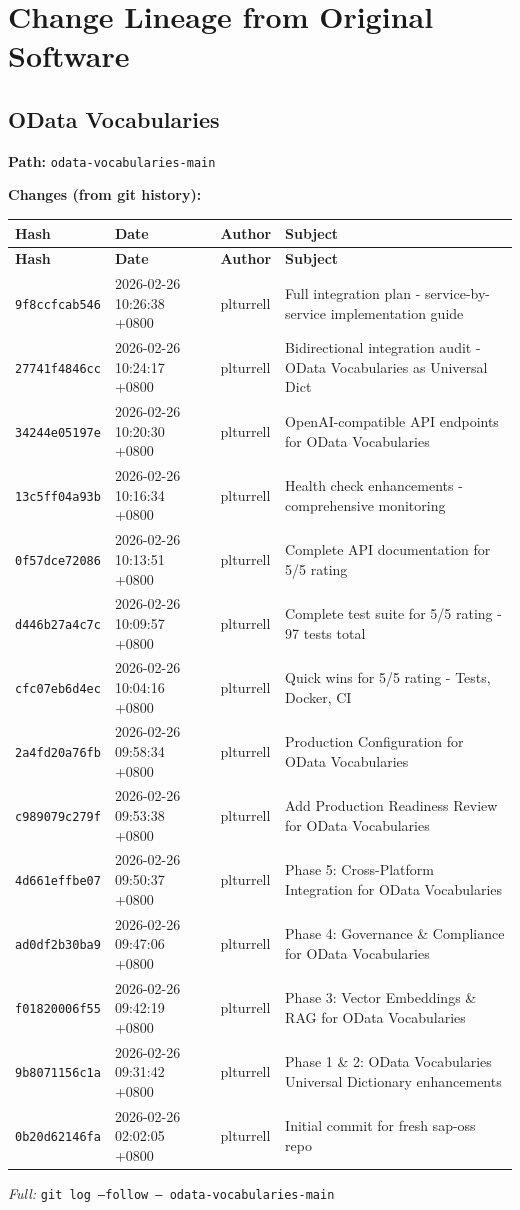 \documentclass[11pt]{article}
\begin{document}
\newpage
\section{Change Lineage from Original Software}

\subsection{OData Vocabularies}
\textbf{Path:} \texttt{odata-vocabularies-main}

\textbf{Changes (from git history):}
\begin{longtable}{|p{2.2cm}|p{3.2cm}|l|p{6cm}|}
\hline \textbf{Hash} & \textbf{Date} & \textbf{Author} & \textbf{Subject} \\ \hline \endfirsthead
\hline \textbf{Hash} & \textbf{Date} & \textbf{Author} & \textbf{Subject} \\ \hline \endhead
\texttt{9f8ccfcab546} & 2026-02-26 10:26:38 +0800 & plturrell & Full integration plan - service-by-service implementation guide \\
\texttt{27741f4846cc} & 2026-02-26 10:24:17 +0800 & plturrell & Bidirectional integration audit - OData Vocabularies as Universal Dict \\
\texttt{34244e05197e} & 2026-02-26 10:20:30 +0800 & plturrell & OpenAI-compatible API endpoints for OData Vocabularies \\
\texttt{13c5ff04a93b} & 2026-02-26 10:16:34 +0800 & plturrell & Health check enhancements - comprehensive monitoring \\
\texttt{0f57dce72086} & 2026-02-26 10:13:51 +0800 & plturrell & Complete API documentation for 5/5 rating \\
\texttt{d446b27a4c7c} & 2026-02-26 10:09:57 +0800 & plturrell & Complete test suite for 5/5 rating - 97 tests total \\
\texttt{cfc07eb6d4ec} & 2026-02-26 10:04:16 +0800 & plturrell & Quick wins for 5/5 rating - Tests, Docker, CI \\
\texttt{2a4fd20a76fb} & 2026-02-26 09:58:34 +0800 & plturrell & Production Configuration for OData Vocabularies \\
\texttt{c989079c279f} & 2026-02-26 09:53:38 +0800 & plturrell & Add Production Readiness Review for OData Vocabularies \\
\texttt{4d661effbe07} & 2026-02-26 09:50:37 +0800 & plturrell & Phase 5: Cross-Platform Integration for OData Vocabularies \\
\texttt{ad0df2b30ba9} & 2026-02-26 09:47:06 +0800 & plturrell & Phase 4: Governance \& Compliance for OData Vocabularies \\
\texttt{f01820006f55} & 2026-02-26 09:42:19 +0800 & plturrell & Phase 3: Vector Embeddings \& RAG for OData Vocabularies \\
\texttt{9b8071156c1a} & 2026-02-26 09:31:42 +0800 & plturrell & Phase 1 \& 2: OData Vocabularies Universal Dictionary enhancements \\
\texttt{0b20d62146fa} & 2026-02-26 02:02:05 +0800 & plturrell & Initial commit for fresh sap-oss repo \\
\hline
\end{longtable}
\textit{Full:} \texttt{git log --follow -- odata-vocabularies-main}
\end{document}
